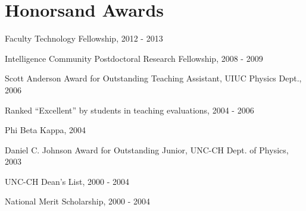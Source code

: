 \section{\sc Honors\newline and Awards} %
\begin{list2}
\item[-] Faculty Technology Fellowship, 2012 - 2013
\item[-] Intelligence Community Postdoctoral Research Fellowship, 2008 - 2009
\item[-] Scott Anderson Award for Outstanding Teaching Assistant, UIUC Physics Dept., 2006
\item[-] Ranked ``Excellent'' by students in teaching evaluations, 2004 - 2006
\item[-] Phi Beta Kappa, 2004
\item[-] Daniel C. Johnson Award for Outstanding Junior, UNC-CH Dept. of Physics, 2003
\item[-] UNC-CH Dean's List, 2000 - 2004
\item[-] National Merit Scholarship, 2000 - 2004
\end{list2}

